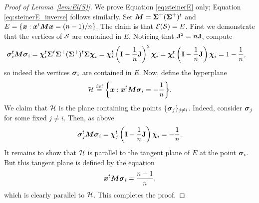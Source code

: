 \begin{proof}[Proof of Lemma~\ref{lem:El(S)}]
	We prove Equation  \eqref{eq:steinerE} only; Equation \eqref{eq:steinerE_inverse} follows similarly. 
	Set ${\vb*{M}}=\boldsymbol{\Sigma}^+(\boldsymbol{\Sigma}^+)^t$ and $E=\{\vb*{x}:\vb*{x}^t {\vb*{M}}\vb*{x}=(n-1)/n\}$. The claim is that $\mathcal{E}(\mathcal{S})=E$.  
	First we demonstrate that the vertices of $\mathcal{S}$ are contained in $E$. Noticing that $\vb{J}^2=n\vb{J}$, compute 
	\begin{align*}
	\vb*{\sigma}_i^t {\vb*{M}} \vb*{\sigma}_i &= \boldsymbol{\chi}_i^t \boldsymbol{\Sigma}^t \boldsymbol{\Sigma}^+(\boldsymbol{\Sigma}^+)^t \boldsymbol{\Sigma} \boldsymbol{\chi}_i = \boldsymbol{\chi}_i^t \left(\vb{I}-\frac{1}{n}\vb{J}\right)^2 \boldsymbol{\chi}_i = \boldsymbol{\chi}_i^t \left(\vb{I}-\frac{1}{n}\vb{J}\right) \boldsymbol{\chi}_i = 1 - \frac{1}{n}, 
	\end{align*}
	so indeed the vertices $\vb*{\sigma}_i$ are contained in $E$. Now, define the hyperplane 
	\[\mathcal{H}\overset{\text{def}}{=} \bigg\{\vb*{x}:\vb*{x}^t {\vb*{M}} \vb*{\sigma}_i = -\frac{1}{n}\bigg\}.\]
	We claim that $\mathcal{H}$ is the plane containing the points $\{\vb*{\sigma}_j\}_{j\neq i}$. Indeed, consider $\vb*{\sigma}_j$ for some fixed $j\neq i$. Then, as above 
	\[\vb*{\sigma}_j^t {\vb*{M}}\vb*{\sigma}_i = \boldsymbol{\chi}_j^t \left(\vb{I}-\frac{1}{n}\vb{J}\right) \boldsymbol{\chi}_i = -\frac{1}{n}. \]
	It remains to show that $\mathcal{H}$ is parallel to the tangent plane of $E$ at the point $\vb*{\sigma}_i$. But this tangent plane is defined by the equation~\cite{fiedler2005geometry} 
	\[\vb*{x}^t {\vb*{M}}\vb*{\sigma}_i =\frac{n-1}{n},\]
	which is clearly parallel to $\mathcal{H}$. This completes the proof.
\end{proof}

